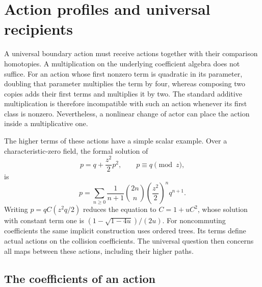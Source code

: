 \chapter{Action profiles and universal recipients}
\label{chap:vol2-recipients}

A universal boundary action must receive actions together with their
comparison homotopies. A multiplication on the underlying coefficient
algebra does not suffice. For an action whose first nonzero term is
quadratic in its parameter, doubling that parameter multiplies the term
by four, whereas composing two copies adds their first terms and
multiplies it by two. The standard additive multiplication is therefore
incompatible with such an action whenever its first class is nonzero.
Nevertheless, a nonlinear change of actor can place the action inside
a multiplicative one.

The higher terms of these actions have a simple scalar example. Over a
characteristic-zero field, the formal solution of
\[
 p=q+\frac{z^2}{2}p^2,\qquad p\equiv q\pmod z,
\]
is
\[
 p=\sum_{n\geq0}\frac{1}{n+1}\binom{2n}{n}
                 \left(\frac{z^2}{2}\right)^n q^{n+1}.
\]
Writing $p=qC(z^2q/2)$ reduces the equation to $C=1+uC^2$,
whose solution with constant term one is
$(1-\sqrt{1-4u})/(2u)$. For noncommuting coefficients the same
implicit construction uses ordered trees. Its terms define actual
actions on the collision coefficients. The universal question then
concerns all maps between these actions, including their higher paths.

\begingroup
\newcommand{\vCE}{\operatorname{CE}_{\star}}
\newcommand{\vU}{U_{\star}}
\newcommand{\vB}{\operatorname{B}_{\star}}
\newcommand{\vSym}{\operatorname{Sym}_{\star}}
\newcommand{\vRH}{\operatorname{RHom}}
\newcommand{\vMap}{\operatorname{Map}}
\newcommand{\vot}{\mathbin{\otimes^!}}
\newcommand{\vM}{\mathscr M}
\newcommand{\vF}{\mathscr F}
\newcommand{\vAct}{\mathscr A_C}
\newcommand{\vMon}{\mathscr B_C}
\newcommand{\vEnd}{\mathcal E_C}
\newcommand{\vid}{\mathrm{id}}

\section{The coefficients of an action}
\label{sec:vol2-action-carrier}

